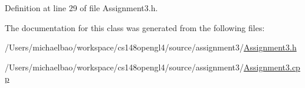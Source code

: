 Definition at line 29 of file Assignment3.\+h.



The documentation for this class was generated from the following files\+:\begin{DoxyCompactItemize}
\item 
/\+Users/michaelbao/workspace/cs148opengl4/source/assignment3/\hyperlink{_assignment3_8h}{Assignment3.\+h}\item 
/\+Users/michaelbao/workspace/cs148opengl4/source/assignment3/\hyperlink{_assignment3_8cpp}{Assignment3.\+cpp}\end{DoxyCompactItemize}
